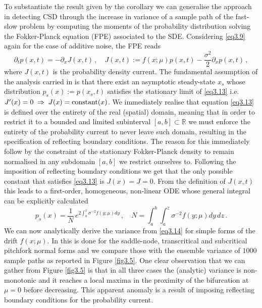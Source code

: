\documentclass[../main.tex]{subfiles}
\begin{document}
To substantiate the result given by the corollary we can generalise the approach in detecting CSD through the increase in variance of a sample path of the fast-slow problem by computing the moments of the probability distribution solving the Fokker-Planck equation (FPE) associated to the SDE.
Considering \eqref{eq3.9} again for the case of additive noise, the FPE reads
\begin{equation}\label{eq3.13}
     \partial_{t}p(x,t) = -\partial_{x}J(x,t)\,,\quad J(x,t):= f(x;\mu)p(x,t) - \frac{\sigma^{2}}{2}\partial_{x}p(x,t) \,,
\end{equation}
where $J(x,t)$ is the probability density current.
The fundamental assumption of the analysis carried in \cite{Kuehn11} is that there exist an asymptotic steady-state $x_{s}$ whose distribution $p_{s}(x):=p(x_{s},t)$ satisfies the stationary limit of \eqref{eq3.13} i.e. $J'(x) = 0\;\Rightarrow\; J(x) = \text{constant}(x)$. 
We immediately realise that equation \eqref{eq3.13} is defined over the entirety of the real (spatial) domain, meaning that in order to restrict it to a bounded and limited subinterval $[a,b]\subset \mathbb{R}$ we must enforce the entirety of the probability current to never leave such domain, resulting in the specification of reflecting boundary conditions. 
The reason for this immediately follow by the constraint of the stationary Fokker-Planck density to remain normalised in any subdomain $[a,b]$ we restrict ourselves to.
Following the imposition of reflecting boundary conditions we get that the only possible constant that satisfies \eqref{eq3.13} is $J(x)=J=0$. From the definition of $J(x,t)$ this leads to a first-order, homogeneous, non-linear ODE whose general integral can be explicitly calculated
\begin{equation}\label{eq3.14}
     p_{s}(x)=\frac{1}{N}\,e^{2 \int_{a}^{x}\sigma^{-2}f(y;\mu)dy}\,,\quad N = \int_{a}^{b}\int_{a}^{z}\sigma^{-2}f(y;\mu)dy\,dz\,.
\end{equation}
We can now analytically derive the variance from \eqref{eq3.14} for simple forms of the drift $f(x;\mu)$. In \cite{Kuehn11} this is done for the saddle-node, transcritical and subcritical pitchfork normal forms and we compare those with the ensemble variance of $1000$ sample paths as reported in Figure \ref{fig3.5}.
One clear observation that we can gather from Figure \ref{fig3.5} is that in all three cases the (analytic) variance is non-monotonic and it reaches a local maxima in the proximity of the bifurcation at $\mu=0$ before decreasing. 
This apparent anomaly is a result of imposing reflecting boundary conditions for the probability current.
\end{document}

